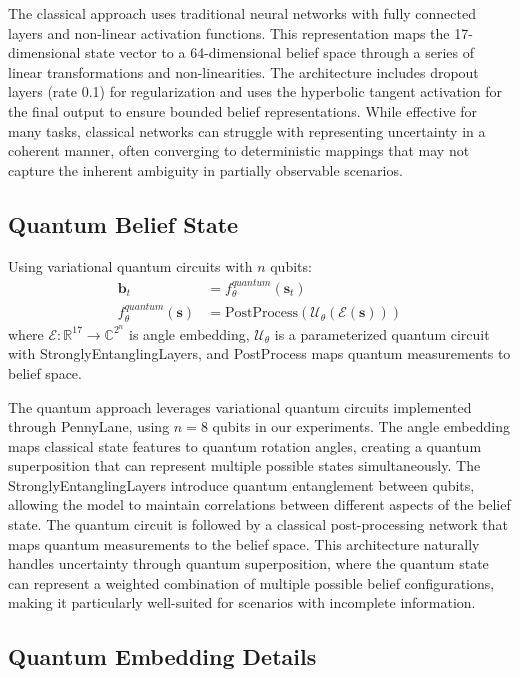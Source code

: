 \documentclass[11pt]{article}
\begin{document}
The classical approach uses traditional neural networks with fully connected layers and non-linear activation functions. This representation maps the 17-dimensional state vector to a 64-dimensional belief space through a series of linear transformations and non-linearities. The architecture includes dropout layers (rate 0.1) for regularization and uses the hyperbolic tangent activation for the final output to ensure bounded belief representations. While effective for many tasks, classical networks can struggle with representing uncertainty in a coherent manner, often converging to deterministic mappings that may not capture the inherent ambiguity in partially observable scenarios.

\subsection{Quantum Belief State}
Using variational quantum circuits with $n$ qubits:
\begin{align}
    \mathbf{b}_t &= f_{\theta}^{quantum}(\mathbf{s}_t) \\
    f_{\theta}^{quantum}(\mathbf{s}) &= \text{PostProcess}(\mathcal{U}_{\theta}(\mathcal{E}(\mathbf{s})))
\end{align}
where $\mathcal{E}: \mathbb{R}^{17} \rightarrow \mathbb{C}^{2^n}$ is angle embedding, $\mathcal{U}_{\theta}$ is a parameterized quantum circuit with StronglyEntanglingLayers, and PostProcess maps quantum measurements to belief space.

The quantum approach leverages variational quantum circuits implemented through PennyLane, using $n=8$ qubits in our experiments. The angle embedding maps classical state features to quantum rotation angles, creating a quantum superposition that can represent multiple possible states simultaneously. The StronglyEntanglingLayers introduce quantum entanglement between qubits, allowing the model to maintain correlations between different aspects of the belief state. The quantum circuit is followed by a classical post-processing network that maps quantum measurements to the belief space. This architecture naturally handles uncertainty through quantum superposition, where the quantum state can represent a weighted combination of multiple possible belief configurations, making it particularly well-suited for scenarios with incomplete information.

\subsection{Quantum Embedding Details}
\end{document}
